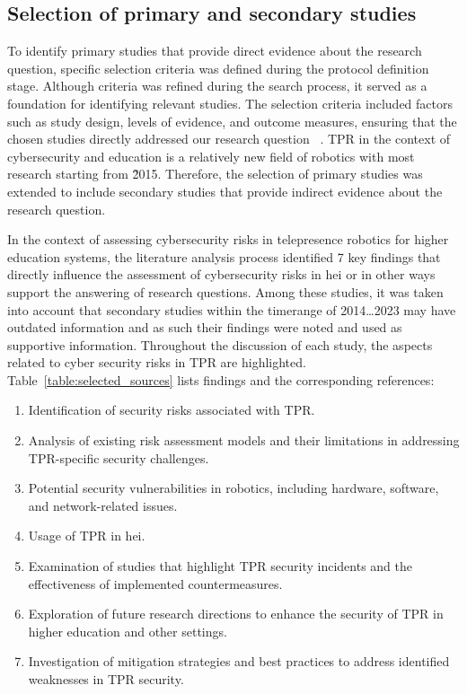 \subsection{Selection of primary and secondary studies}\label{subsec:selection-of-studies}

To identify primary studies that provide direct evidence about the research question, specific selection criteria was defined during the
protocol definition stage. Although criteria was refined during the search process, it served as a foundation for identifying
relevant studies. The selection criteria included factors such as study design, levels of evidence, and outcome measures, ensuring that the
chosen studies directly addressed our research question ~\cite[10-16]{systematic_review_2004}. \ac{TPR} in the context of cybersecurity
and education is a relatively new field of robotics with most research starting from 2̃015. Therefore, the selection of primary
studies was
extended to include secondary studies that provide indirect evidence about the research question.

In the context of assessing cybersecurity risks in telepresence robotics for higher education systems, the literature analysis process
identified 7 key findings that directly influence the assessment of cybersecurity risks in \ac{hei} or in other ways support the
answering of research questions. Among
these studies, it was taken into account that secondary studies within the timerange of 2014\ldots2023 may have outdated information and
as such their findings were noted and used as supportive information. Throughout the discussion of each study, the aspects related to
cyber security risks in \ac{TPR} are highlighted. Table~\ref{table:selected_sources} lists findings and the corresponding references:

\begin{enumerate}
  \item Identification of security risks associated with \ac{TPR}. %
  \item Analysis of existing risk assessment models and their limitations in addressing \ac{TPR}-specific security challenges. %
  \item Potential security vulnerabilities in robotics, including hardware, software, and network-related issues. %
  \item Usage of \ac{TPR} in \ac{hei}. %
  \item Examination of studies that highlight \ac{TPR} security incidents and the effectiveness of implemented countermeasures. %
  \item Exploration of future research directions to enhance the security of \ac{TPR} in higher education and other settings. %
  \item Investigation of mitigation strategies and best practices to address identified weaknesses in \ac{TPR} security. %
\end{enumerate}

